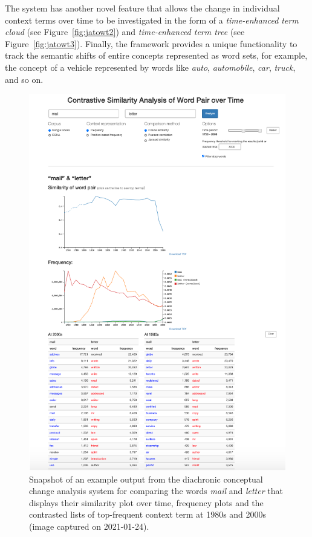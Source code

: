 \documentclass[output=paper]{langsci/langscibook}
\begin{document}
The system has another novel feature that allows the change in individual context terms over time to be investigated in the form of a \emph{time-enhanced term cloud} (see Figure~\ref{fig:jatowt2}) and \emph{time-enhanced term tree} (see Figure~\ref{fig:jatowt3}). Finally, the framework provides a unique functionality to track the semantic shifts of entire concepts represented as word sets, for example, the concept of a vehicle represented by words like \emph{auto}, \emph{automobile}, \emph{car}, \emph{truck}, and so on. 

\begin{figure}
	\includegraphics[width=.915\textwidth]{figures/JATOWT_jatowt0.png}
        \caption{Snapshot of an example output from the diachronic conceptual change analysis system for comparing the words \textit{mail} and \textit{letter} that displays their similarity plot over time, frequency plots and the contrasted lists of top-frequent context term at 1980s and 2000s (image captured on 2021-01-24).\label{fig:jatowt0}}
\end{figure}
\end{document}
